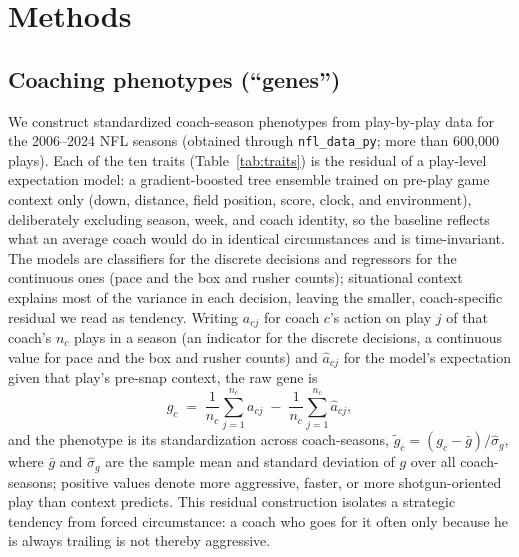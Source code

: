 \documentclass[
  journal=ehs,
  manuscript=article,
  year=2026,
  volume=8,
]{cup-journal}
\begin{document}
\section{Methods}\label{sec:methods}

\subsection{Coaching phenotypes (``genes'')}
We construct standardized coach-season phenotypes from play-by-play data for the
2006--2024 NFL seasons (obtained through \texttt{nfl\_data\_py}; more than 600{,}000
plays). Each of the ten traits (Table~\ref{tab:traits}) is the residual of a
play-level expectation model: a gradient-boosted tree ensemble trained on pre-play
game context only (down, distance, field position, score, clock, and environment),
deliberately excluding season, week, and coach identity, so the baseline reflects what
an average coach would do in identical circumstances and is time-invariant. The models
are classifiers for the discrete decisions and regressors for the continuous ones
(pace and the box and rusher counts); situational context explains most of the
variance in each decision, leaving the smaller, coach-specific residual we read as
tendency. Writing $a_{cj}$ for coach $c$'s action on play $j$ of that coach's
$n_c$ plays in a season (an indicator for the discrete decisions, a continuous value
for pace and the box and rusher counts) and $\hat{a}_{cj}$ for the model's
expectation given that play's pre-snap context, the raw gene is
\begin{equation}
  g_c \;=\; \frac{1}{n_c}\sum_{j=1}^{n_c} a_{cj}
          \;-\; \frac{1}{n_c}\sum_{j=1}^{n_c} \hat{a}_{cj},
  \label{eq:gene}
\end{equation}
and the phenotype is its standardization across coach-seasons,
$\tilde{g}_c = (g_c - \bar{g})/\hat{\sigma}_g$, where $\bar{g}$ and $\hat{\sigma}_g$
are the sample mean and standard deviation of $g$ over all coach-seasons; positive
values denote more
aggressive, faster, or more shotgun-oriented play than context predicts. This
residual construction isolates a strategic tendency from forced circumstance: a
coach who goes for it often only because he is always trailing is not thereby
aggressive.
\end{document}
